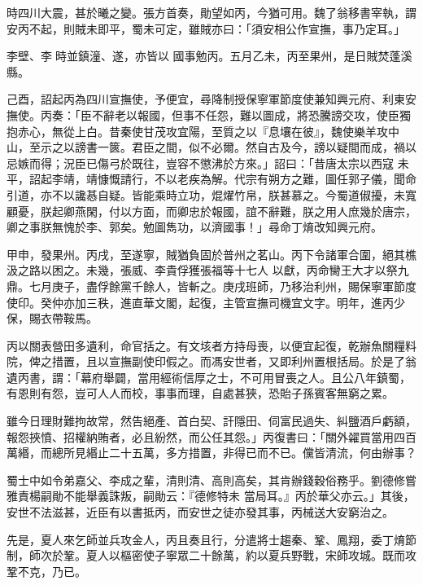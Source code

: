 \begin{pinyinscope}
 時四川大震，甚於曦之變。張方首奏，勛望如丙，今猶可用。魏了翁移書宰執，謂安丙不起，則賊未即平，蜀未可定，雖賊亦曰：「須安相公作宣撫，事乃定耳。」



 李壁、李𡌴時並鎮潼、遂，亦皆以
 國事勉丙。五月乙未，丙至果州，是日賊焚蓬溪縣。



 己酉，詔起丙為四川宣撫使，予便宜，尋降制授保寧軍節度使兼知興元府、利東安撫使。丙奏：「臣不辭老以報國，但事不任怨，難以圖成，將恐騰謗交攻，使臣獨抱赤心，無從上白。昔秦使甘茂攻宜陽，至質之以『息壤在彼』，魏使樂羊攻中山，至示之以謗書一篋。君臣之間，似不必爾。然自古及今，謗以疑間而成，禍以忌嫉而得；況臣已傷弓於既往，豈容不懲沸於方來。」詔曰：「昔唐太宗以西寇
 未平，詔起李靖，靖慷慨請行，不以老疾為解。代宗有朔方之難，圖任郭子儀，聞命引道，亦不以讒惎自疑。皆能乘時立功，焜燿竹帛，朕甚慕之。今蜀道俶擾，未寬顧憂，朕起卿燕閑，付以方面，而卿忠於報國，誼不辭難，朕之用人庶幾於唐宗，卿之事朕無愧於李、郭矣。勉圖雋功，以濟國事！」尋命丁焴改知興元府。



 甲申，發果州。丙戌，至遂寧，賊猶負固於普州之茗山。丙下令諸軍合圍，絕其樵汲之路以困之。未幾，張威、李貴俘獲張福等十七人
 以獻，丙命臠王大才以祭九鼎。七月庚子，盡俘餘黨千餘人，皆斬之。庚戌班師，乃移治利州，賜保寧軍節度使印。癸仲亦加三秩，進直華文閣，起復，主管宣撫司機宜文字。明年，進丙少保，賜衣帶鞍馬。



 丙以關表營田多遺利，命官括之。有文垓者方持母喪，以便宜起復，乾辦魚關糧料院，俾之措置，且以宣撫副使印假之。而馮安世者，又即利州置根括局。於是了翁遺丙書，謂：「幕府舉闢，當用經術信厚之士，不可用冒喪之人。且公八年鎮蜀，
 有恩則有怨，豈可人人而校，事事而理，自處甚狹，恐貽子孫賓客無窮之累。



 雖今日理財難拘故常，然告絕產、首白契、訐隱田、伺富民過失、糾鹽酒戶虧額，報怨挾憤、招權納賄者，必且紛然，而公任其怨。」丙復書曰：「關外糴買當用四百萬緡，而總所見緡止二十五萬，多方措置，非得已而不已。儻皆清流，何由辦事？



 蜀士中如令弟嘉父、李成之輩，清則清、高則高矣，其肯辦錢穀俗務乎。劉德修嘗雅責楊嗣勛不能舉義誅叛，嗣勛云：『德修特未
 當局耳。』丙於華父亦云。」其後，安世不法滋甚，近臣有以書抵丙，而安世之徒亦發其事，丙械送大安窮治之。



 先是，夏人來乞師並兵攻金人，丙且奏且行，分遣將士趨秦、鞏、鳳翔，委丁焴節制，師次於鞏。夏人以樞密使子寧眾二十餘萬，約以夏兵野戰，宋師攻城。既而攻鞏不克，乃已。




\end{pinyinscope}
